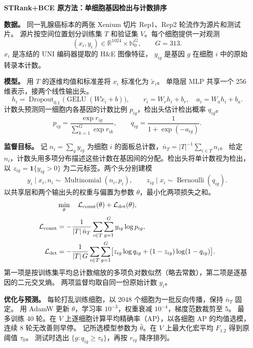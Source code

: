 \documentclass[UTF8,a4paper,11pt,fontset=fandol]{ctexart}
\newcommand{\ind}{\mathbf{1}}
\begin{document}
\begin{center}
  {\Large\bfseries STRank+BCE 原方法：单细胞基因检出与计数排序}
\end{center}

\textbf{数据。}
同一乳腺癌标本的两张 Xenium 切片 Rep1、Rep2 轮流作为源片和测试片。
源片按空间位置划分训练集 \(T\) 和验证集 \(V\)。每个细胞提供一对观测
\[
  (x_i,y_i)\in\mathbb{R}^{1024}\times\mathbb{N}_0^G,\qquad G=313 .
\]
\(x_i\) 是冻结的 UNI 编码器提取的 H\&E 图像特征，
\(y_{ig}\) 是基因 \(g\) 在细胞 \(i\) 中的原始转录本计数。

\textbf{模型。}
用 \(T\) 的逐维均值和标准差将 \(x_i\) 标准化为 \(\tilde x_i\)。
单隐层 MLP 共享一个 256 维表示，接两个线性输出头。
\[
  h_i=\operatorname{Dropout}_{0.1}\!\bigl(\operatorname{GELU}(W\tilde x_i+b)\bigr),
  \qquad r_i=W_rh_i+b_r,\quad a_i=W_ah_i+b_a .
\]
计数头预测同一细胞内各基因的计数比例 \(p_{ig}\)，检出头估计检出概率 \(q_{ig}\)。
\[
  p_{ig}=\frac{\exp r_{ig}}{\sum_{k=1}^{G}\exp r_{ik}},\qquad
  q_{ig}=\frac{1}{1+\exp(-a_{ig})}.
\]

\textbf{监督目标。}
记 \(n_i=\sum_g y_{ig}\) 为细胞 \(i\) 的面板总计数，\(\bar n_T=|T|^{-1}\sum_{i\in T}n_i\)。
给定 \(n_i\)，计数头用多项分布描述这些计数在基因间的分配。检出头将单计数视为检出，
以 \(z_{ig}=\ind\{y_{ig}>0\}\) 为二元标签。两个头分别建模
\[
 y_i\mid x_i,n_i\sim\operatorname{Multinomial}(n_i,p_i),\qquad
 z_{ig}\mid x_i\sim\operatorname{Bernoulli}(q_{ig}).
\]
以共享层和两个输出头的权重与偏置为参数 \(\theta\)，最小化两项损失之和。
\[
\begin{aligned}
  &\min_{\theta}\quad \mathcal L_{\rm count}(\theta)+\mathcal L_{\rm det}(\theta),\\[2pt]
  \mathcal L_{\rm count}
    &= -\frac{1}{|T|\,\bar n_T}\sum_{i\in T}\sum_{g=1}^{G} y_{ig}\log p_{ig},\\
  \mathcal L_{\rm det}
    &= -\frac{1}{|T|\,G}\sum_{i\in T}\sum_{g=1}^{G}
       \bigl[z_{ig}\log q_{ig}+(1-z_{ig})\log(1-q_{ig})\bigr].
\end{aligned}
\]
第一项是按训练集平均总计数缩放的多项负对数似然（略去常数），第二项是逐基因的二元交叉熵。
两项监督均取自同一份原始计数 \(y_i\)。

\textbf{优化与预测。}
每轮打乱训练细胞，以 2048 个细胞为一批反向传播，保持 \(\bar n_T\) 固定。
用 AdamW 更新 \(\theta\)，学习率 \(10^{-3}\)，权重衰减 \(10^{-4}\)，梯度范数裁剪至 5。
最多训练 40 轮。在 \(V\) 上逐细胞计算平均精确率（AP），以各细胞 AP 的均值选模，连续 8 轮无改善则早停。
记所选模型参数为 \(\hat\theta\)。在 \(V\) 上最大化宏平均 \(F_{1.2}\) 得到原阈值 \(\tau_0\)。
测试时选出 \(\{g:q_{ig}\ge\tau_0\}\)，再按 \(r_{ig}\) 降序排列。
\end{document}

